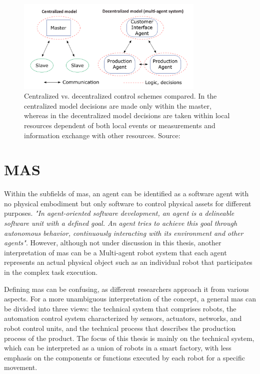 \begin{figure}[htb]
    \includegraphics[width=0.8\textwidth]{figures/State-of-the-art/CentralizeDecentralizeConcept.png}
    \centering
    \caption{Centralized vs. decentralized control schemes compared. 
    In the centralized model decisions are made only within the 
    master, whereas in the decentralized model decisions are taken 
    within local resources dependent of both local events or measurements 
    and information exchange with other resources. 
    Source: \cite[fig.1]{egger_deployment-friendly_2020}\label{fig: CentralizeDecentralizeConcept}}
\end{figure}



\section{MAS}

Within the subfields of \gls{mas}, an agent can be identified as a 
software agent with no physical embodiment but only software to control 
physical assets for different purposes. \textit{"In agent-oriented software 
development, an agent is a delineable software unit with a defined goal. 
An agent tries to achieve this goal through autonomous behavior, 
continuously interacting with its environment and other agents"}\cite{wagner_agentenunterstutztes_2008}. 
However, although not under discussion in this thesis, another 
interpretation of \gls{mas} can be a Multi-agent robot system that 
each agent represents an actual physical object such as an individual 
robot that participates in the complex task execution\cite{ota_multi-agent_2006}.   


Defining \gls{mas} can be confusing, as different researchers approach 
it from various aspects. For a more unambiguous interpretation of the 
concept, a general \gls{mas} can be divided into three views: the 
technical system that comprises robots, the automation control system 
characterized by sensors, actuators, networks, and robot control units, 
and the technical process that describes the production process of the 
product\cite{lauber_prozessautomatisierung_1999}\cite{wannagat_agent_nodate}. 
The focus of this thesis is mainly on the technical system, which can 
be interpreted as a union of robots in a smart factory, with less 
emphasis on the components or functions executed by each robot for 
a specific movement.

